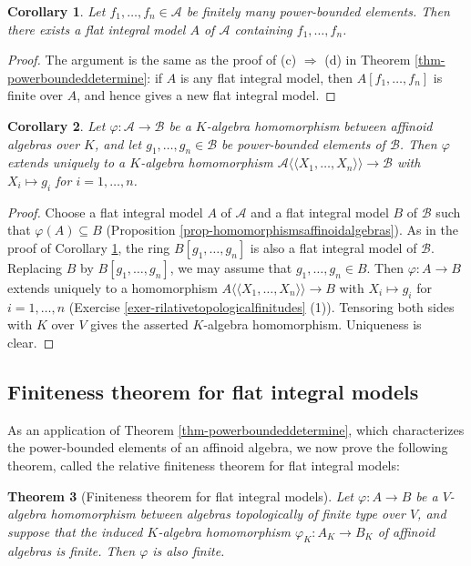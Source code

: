 \documentclass[a4paper,12pt, dvipdfmx]{jsbook}
\def\dl{\langle\!\langle}
\def\dr{\rangle\!\rangle}
\theoremstyle{plain}
\newtheorem{thm}{\bfseries Theorem}[section]
\newtheorem{cor}[thm]{\bfseries Corollary}
\theoremstyle{definition}
\begin{document}
\begin{cor}\label{cor-powerboundeddetermine1}{\rm 
Let $f_1,\ldots,f_n\in\mathcal{A}$ be finitely many power-bounded elements.
Then there exists a flat integral model $A$ of $\mathcal{A}$ containing $f_1,\ldots,f_n$.}
\end{cor}

\begin{proof}[Proof]
The argument is the same as the proof of (c) $\Rightarrow$ (d) in Theorem \ref{thm-powerboundeddetermine}: if $A$ is any flat integral model, then $A[f_1,\ldots,f_n]$ is finite over $A$, and hence gives a new flat integral model.
\end{proof}

\begin{cor}\label{cor-powerboundeddetermine}{\rm 
Let $\varphi\colon\mathcal{A}\rightarrow\mathcal{B}$ be a $K$-algebra homomorphism between affinoid algebras over $K$, and let $g_1,\ldots,g_n\in\mathcal{B}$ be power-bounded elements of $\mathcal{B}$.
Then $\varphi$ extends uniquely to a $K$-algebra homomorphism $\mathcal{A}\dl X_1,\ldots,X_n\dr\rightarrow\mathcal{B}$ with $X_i\mapsto g_i$ for $i=1,\ldots,n$.}
\end{cor}

\begin{proof}[Proof]
Choose a flat integral model $A$ of $\mathcal{A}$ and a flat integral model $B$ of $\mathcal{B}$ such that $\varphi(A)\subseteq B$ (Proposition \ref{prop-homomorphismsaffinoidalgebras}).
As in the proof of Corollary \ref{cor-powerboundeddetermine1}, the ring $B[g_1,\ldots,g_n]$ is also a flat integral model of $\mathcal{B}$. Replacing $B$ by $B[g_1,\ldots,g_n]$, we may assume that $g_1,\ldots,g_n\in B$.
Then $\varphi\colon A\rightarrow B$ extends uniquely to a homomorphism $A\dl X_1,\ldots,X_n\dr\rightarrow B$ with $X_i\mapsto g_i$ for $i=1,\ldots,n$ (Exercise \ref{exer-rilativetopologicalfinitudes} (1)).
Tensoring both sides with $K$ over $V$ gives the asserted $K$-algebra homomorphism.
Uniqueness is clear.
\end{proof}

\subsection{Finiteness theorem for flat integral models}\label{sub-finitenesstheoremintegralmodels}
As an application of Theorem \ref{thm-powerboundeddetermine}, which characterizes the power-bounded elements of an affinoid algebra, we now prove the following theorem, called the relative finiteness theorem for flat integral models:
\begin{thm}[{\rm Finiteness theorem for flat integral models}]\label{thm-finitenesstheoremintegralmodels}{\rm 
Let $\varphi\colon A\rightarrow B$ be a $V$-algebra homomorphism between algebras topologically of finite type over $V$, and suppose that the induced $K$-algebra homomorphism $\varphi_K\colon A_K\rightarrow B_K$ of affinoid algebras is finite.
Then $\varphi$ is also finite.}
\end{thm}
\end{document}
